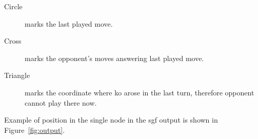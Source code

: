 \begin {description}
\item [ Circle ] marks the last played move.
\item [ Cross ] marks the opponent's moves answering last played move.
\item [ Triangle ] marks the coordinate where ko arose in the last turn, therefore opponent cannot play there now.

\end {description}

\noindent Example of position in the single node in the sgf output is shown in Figure~\ref{fig:output}.


